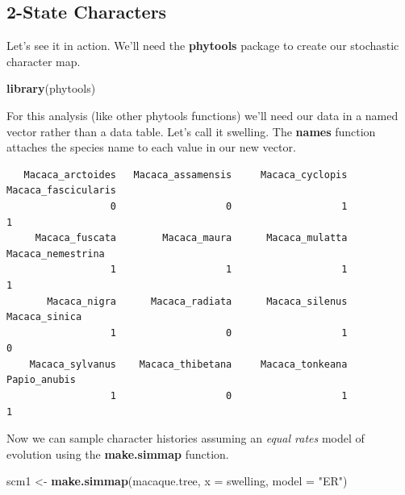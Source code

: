 \documentclass[
]{book}
\newenvironment{Shaded}{\begin{snugshade}}{\end{snugshade}}
\newcommand{\DataTypeTok}[1]{\textcolor[rgb]{0.13,0.29,0.53}{#1}}
\newcommand{\KeywordTok}[1]{\textcolor[rgb]{0.13,0.29,0.53}{\textbf{#1}}}
\newcommand{\NormalTok}[1]{#1}
\newcommand{\OperatorTok}[1]{\textcolor[rgb]{0.81,0.36,0.00}{\textbf{#1}}}
\newcommand{\StringTok}[1]{\textcolor[rgb]{0.31,0.60,0.02}{#1}}
\begin{document}
\hypertarget{state-characters}{%
\subsection{2-State Characters}\label{state-characters}}

Let's see it in action. We'll need the \textbf{phytools} package \citep{phytools} to create our stochastic character map.

\begin{Shaded}
\begin{Highlighting}[]
\KeywordTok{library}\NormalTok{(phytools)}
\end{Highlighting}
\end{Shaded}

For this analysis (like other phytools functions) we'll need our data in a named vector rather than a data table. Let's call it swelling. The \textbf{names} function attaches the species name to each value in our new vector.

\begin{Shaded}
\end{Shaded}

\begin{verbatim}
   Macaca_arctoides   Macaca_assamensis     Macaca_cyclopis Macaca_fascicularis 
                  0                   0                   1                   1 
     Macaca_fuscata        Macaca_maura      Macaca_mulatta   Macaca_nemestrina 
                  1                   1                   1                   1 
       Macaca_nigra      Macaca_radiata      Macaca_silenus       Macaca_sinica 
                  1                   0                   1                   0 
    Macaca_sylvanus    Macaca_thibetana     Macaca_tonkeana        Papio_anubis 
                  1                   0                   1                   1 
\end{verbatim}

Now we can sample character histories assuming an \emph{equal rates} model of evolution using the \textbf{make.simmap} function.

\begin{Shaded}
\begin{Highlighting}[]
\NormalTok{scm1 \textless{}{-}}\StringTok{ }\KeywordTok{make.simmap}\NormalTok{(macaque.tree, }\DataTypeTok{x =}\NormalTok{ swelling, }\DataTypeTok{model =} \StringTok{"ER"}\NormalTok{)}
\end{Highlighting}
\end{Shaded}
\end{document}
